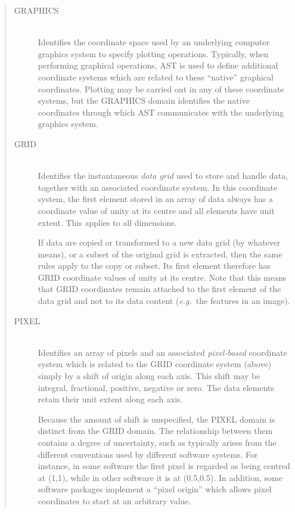 \documentclass[twoside,11pt]{article}
\newenvironment{latexonly}{}{}
\begin{document}
\begin{quote}
\begin{description}
\item[GRAPHICS]\begin{latexonly}\mbox{}\\ \end{latexonly} Identifies
the coordinate space used by an underlying computer graphics system
to specify plotting operations. Typically, when performing graphical
operations, AST is used to define additional coordinate systems which
are related to these ``native'' graphical coordinates.  Plotting may
be carried out in any of these coordinate systems, but the GRAPHICS
domain identifies the native coordinates through which AST
communicates with the underlying graphics system.

\item[GRID]\begin{latexonly}\mbox{}\\ \end{latexonly} Identifies the
instantaneous {\em{data grid}} used to store and handle data, together
with an associated coordinate system. In this coordinate system, the
first element stored in an array of data always has a coordinate value
of unity at its centre and all elements have unit extent. This applies
to all dimensions.

If data are copied or transformed to a new data grid (by whatever
means), or a subset of the original grid is extracted, then the same
rules apply to the copy or subset. Its first element therefore has
GRID coordinate values of unity at its centre. Note that this means
that GRID coordinates remain attached to the first element of the data
grid and not to its data content ({\em{e.g.}}\ the features in an
image).

\item[PIXEL]\begin{latexonly}\mbox{}\\ \end{latexonly}
Identifies an array of pixels and an associated {\em{pixel-based}}
coordinate system which is related to the GRID coordinate system
(above) simply by a shift of origin along each axis. This shift may be
integral, fractional, positive, negative or zero. The data elements
retain their unit extent along each axis.

Because the amount of shift is unspecified, the PIXEL domain is
distinct from the GRID domain. The relationship between them contains
a degree of uncertainty, such as typically arises from the different
conventions used by different software systems. For instance, in some
software the first pixel is regarded as being centred at (1,1), while
in other software it is at (0.5,0.5). In addition, some software
packages implement a ``pixel origin'' which allows pixel coordinates
to start at an arbitrary value.


\end{description}
\end{quote}
\end{document}
